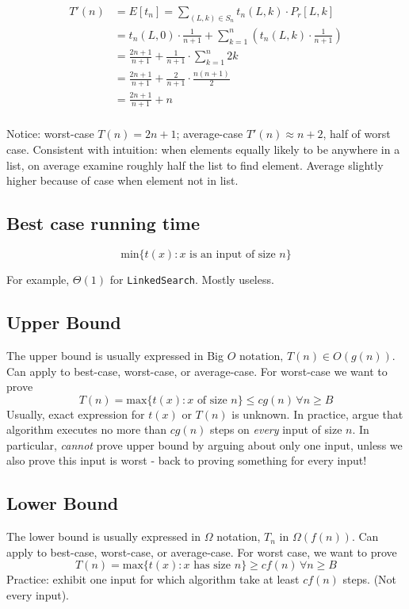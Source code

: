 \begin{align*}
T'(n) &= E[t_n] = \sum_{(L,k) \in S_n} t_n(L, k) \cdot P_r[L,k] \\
&= t_n(L,0) \cdot \frac{1}{n+1} + \sum_{k=1}^n \left ( t_n(L,k) \cdot \frac{1}{n+1} \right ) \\
&= \frac{2n+1}{n+1} + \frac{1}{n+1} \cdot \sum_{k=1}^n 2k \\
&= \frac{2n+1}{n+1} + \frac{2}{n+1} \cdot \frac{n(n+1)}{2} \\
&= \frac{2n+1}{n+1} + n \\
\end{align*}

\noindent Notice: worst-case $T(n)=2n+1$; average-case $T'(n) \approx n+2$, half of worst case. Consistent with 
	intuition: when elements equally likely to be anywhere in a list, on average examine roughly half the list
	to find element. Average slightly higher because of case when element not in list.

\subsection*{Best case running time}

$$\textrm{min}\{t(x): x \textrm{ is an input of size }n\}$$

\noindent For example, $\Theta(1)$ for \texttt{LinkedSearch}. Mostly useless.

\subsection*{Upper Bound}

\noindent The upper bound is usually expressed in Big $O\textrm{ notation, }T(n) \in O(g(n))$. Can apply to best-case, worst-case, or average-case. For worst-case we want to prove
$$T(n) = \textrm{max}\{t(x): x \textrm{ of size } n\} \leq cg(n) \,\forall n \geq B$$ 
Usually, exact expression for $t(x)$ or $T(n)$ is unknown. In practice, argue that algorithm executes no more than
$cg(n)$ steps on \textit{every} input of size $n$. In particular, \textit{cannot} prove upper bound by arguing about
only one input, unless we also prove this input is worst - back to proving something for every input!

\subsection*{Lower Bound}

\noindent The lower bound is usually expressed in $\Omega$ notation, $T_n \textrm{ in } \Omega(f(n))$. 
Can apply to best-case, worst-case, or average-case. For worst case, we want to prove
$$T(n) = \textrm{max}\{t(x): x \textrm{ has size } n\} \geq cf(n) \,\forall n \geq B$$
Practice: exhibit one	 input for which algorithm take at least $cf(n)$ steps. (Not every input).


